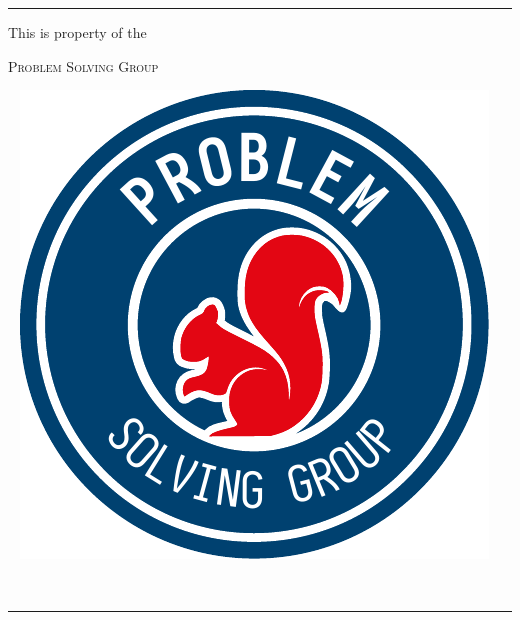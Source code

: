 \documentclass{scrartcl}
\theoremstyle{definition}
\begin{document}
	\hrule

	\begin{minipage}{.75\textwidth}{}
		{This is property of the}

		\textsc{Problem Solving Group}
	\end{minipage}
	\begin{minipage}{.2\textwidth}{}
		\ \hfill
		\includegraphics[height = \textwidth]{psg_logo}
	\end{minipage}\\[.7em]

	\hrule
\end{document}

